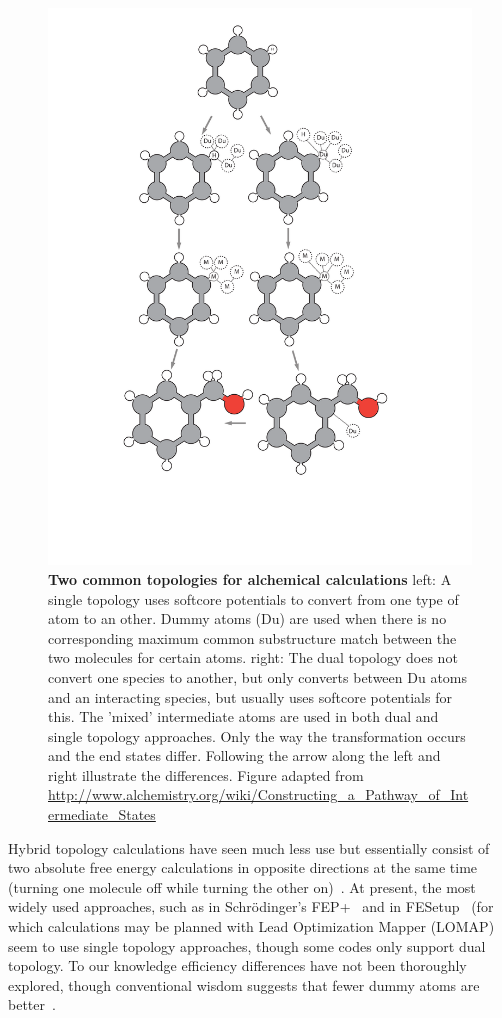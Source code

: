 \documentclass[9pt,bestpractices]{livecoms}
\begin{document}
\begin{figure}[h!]
    \includegraphics[width=0.95\columnwidth]{figures/fig3_topol/Figure.pdf}
    \caption{\textbf{Two common topologies for alchemical calculations} left: A single topology uses softcore potentials to convert from one type of atom to an other. Dummy atoms (Du) are used when there is no corresponding maximum common substructure match between the two molecules for certain atoms. right: The dual topology does not convert one species to another, but only converts between Du atoms and an interacting species, but usually uses softcore potentials for this. The 'mixed' intermediate atoms are used in both dual and single topology approaches. Only the way the transformation occurs and the end states differ. Following the arrow along the left and right illustrate the differences.  Figure adapted from \url{http://www.alchemistry.org/wiki/Constructing_a_Pathway_of_Intermediate_States}}
    \label{fig:fig_topology}
\end{figure} 
Hybrid topology calculations have seen much less use but essentially consist of two absolute free energy calculations in opposite directions at the same time (turning one molecule off while turning the other on)~\cite{jiang2019computing}.
At present, the most widely used approaches, such as in Schr\"{o}dinger's FEP+~\cite{wang2019protein} and in FESetup~\cite{loeffler2015fesetup} (for which calculations may be planned with Lead Optimization Mapper (LOMAP)~\cite{liu2013lead} seem to use single topology approaches, though some codes only support dual topology.
To our knowledge efficiency differences have not been thoroughly explored, though conventional wisdom suggests that fewer dummy atoms are better~\cite{liu2013lead,mobley2012perspective}.
%
\end{document}
